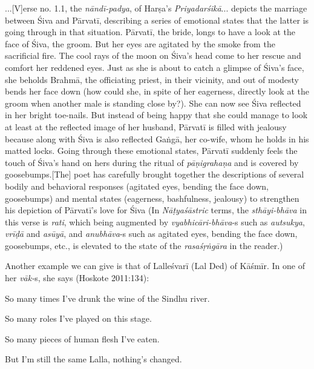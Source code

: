 \begin{myquote}
...[V]erse no. 1.1, the \textsl{nāndī-padya}, of Harṣa’s \textsl{Priyadarśikā}... depicts the marriage between Śiva and Pārvatī, describing a series of emotional states that the latter is going through in that situation. Pārvatī, the bride, longs to have a look at the face of Śiva, the groom. But her eyes are agitated by the smoke from the sacrificial fire. The cool rays of the moon on Śiva’s head come to her rescue and comfort her reddened eyes. Just as she is about to catch a glimpse of Śiva’s face, she beholds Brahmā, the officiating priest, in their vicinity, and out of modesty bends her face down (how could she, in spite of her eagerness, directly look at the groom when another male is standing close by?). She can now see Śiva reflected in her bright toe-nails. But instead of being happy that she could manage to look at least at the reflected image of her husband, Pārvatī is filled with jealousy because along with Śiva is also reflected Gaṅgā, her co-wife, whom he holds in his matted locks. Going through these emotional states, Pārvatī suddenly feels the touch of Śiva’s hand on hers during the ritual of \textsl{pāṇigrahaṇa} and is covered by goosebumps.[The] poet has carefully brought together the descriptions of several bodily and behavioral responses (agitated eyes, bending the face down, goosebumps) and mental states (eagerness, bashfulness, jealousy) to strengthen his depiction of Pārvatī’s love for Śiva (In \textsl{Nāṭyaśāstric} terms, the \textsl{sthāyi-bhāva} in this verse is \textsl{rati}, which being augmented by \textsl{vyabhicāri-bhāva}-s such as \textsl{autsukya}, \textsl{vrīḍā} and \textsl{asūyā}, and \textsl{anubhāva}-s such as agitated eyes, bending the face down, goosebumps, etc., is elevated to the state of the \textsl{rasaśṛṅgāra} in the reader.)
\end{myquote}

Another example we can give is that of Lalleśvarī (Lal Ded) of Kāśmīr. In one of her \textsl{vāk-}s, she says (Hoskote 2011:134):

\begin{myquote}
So many times I’ve drunk the wine of the Sindhu river.

So many roles I’ve played on this stage.

So many pieces of human flesh I’ve eaten.

But I’m still the same Lalla, nothing’s changed.
\end{myquote}

